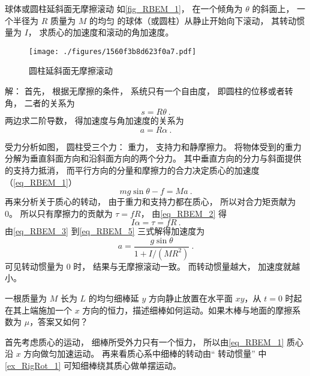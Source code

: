 \begin{example}{球体或圆柱延斜面无摩擦滚动}\label{ex_RBEM_1}
如\autoref{fig_RBEM_1}， 在一个倾角为 $\theta$ 的斜面上， 一个半径为 $R$ 质量为 $M$ 的均匀 的球体（或圆柱）从静止开始向下滚动， 其转动惯量为 $I$， 求质心的加速度和滚动的角加速度。

\begin{figure}[ht]
\centering
\texttt{[image: ./figures/1560f3b8d623f0a7.pdf]}
\caption{圆柱延斜面无摩擦滚动} \label{fig_RBEM_1}
\end{figure}

解： 首先， 根据无摩擦的条件， 系统只有一个自由度， 即圆柱的位移或者转角， 二者的关系为
\begin{equation}
s = R\theta~.
\end{equation}
两边求二阶导数， 得加速度与角加速度的关系为
\begin{equation}\label{eq_RBEM_3}
a = R\alpha~.
\end{equation}

受力分析如图， 圆柱受三个力： 重力， 支持力和静摩擦力。 将物体受到的重力分解为垂直斜面方向和沿斜面方向的两个分力。 其中垂直方向的分力与斜面提供的支持力抵消， 而平行方向的分量和摩擦力的合力决定质心的加速度（\autoref{eq_RBEM_1}）
\begin{equation}\label{eq_RBEM_4}
mg\sin\theta - f = Ma~.
\end{equation}
再来分析关于质心的转动， 由于重力和支持力都在质心， 所以对合力矩贡献为 0。 所以只有摩擦力的贡献为 $\tau = fR$， 由\autoref{eq_RBEM_2} 得
\begin{equation}\label{eq_RBEM_5}
I\alpha = \tau = f R~.
\end{equation}
由\autoref{eq_RBEM_3} 到\autoref{eq_RBEM_5} 三式解得加速度为
\begin{equation}
a = \frac{g \sin\theta}{1 + I/(MR^2)}~.
\end{equation}
可见转动惯量为 0 时， 结果与无摩擦滚动一致。 而转动惯量越大， 加速度就越小。
\end{example}

\begin{example}{}
一根质量为 $M$ 长为 $L$ 的均匀细棒延 $y$ 方向静止放置在水平面 $xy$，从 $t=0$ 时起在其上端施加一个 $x$ 方向的恒力，描述细棒如何运动。如果木棒与地面的摩擦系数为 $\mu$，答案又如何？

首先考虑质心的运动， 细棒所受外力只有一个恒力， 所以由\autoref{eq_RBEM_1} 质心沿 $x$ 方向做匀加速运动。 再来看质心系中细棒的转动由“ 转动惯量” 中\autoref{ex_RigRot_1} 可知细棒绕其质心做单摆运动。
\end{example}
